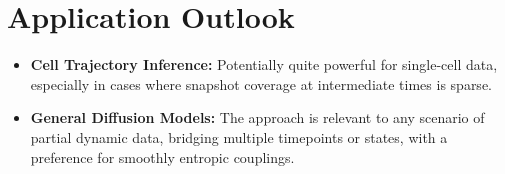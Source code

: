 \documentclass{article}
\begin{document}
\section{Application Outlook}
\begin{itemize}
    \item \textbf{Cell Trajectory Inference:} Potentially quite powerful for single-cell data, especially in cases where snapshot coverage at intermediate times is sparse.
    \item \textbf{General Diffusion Models:} The approach is relevant to any scenario of partial dynamic data, bridging multiple timepoints or states, with a preference for smoothly entropic couplings.
\end{itemize}
\end{document}
